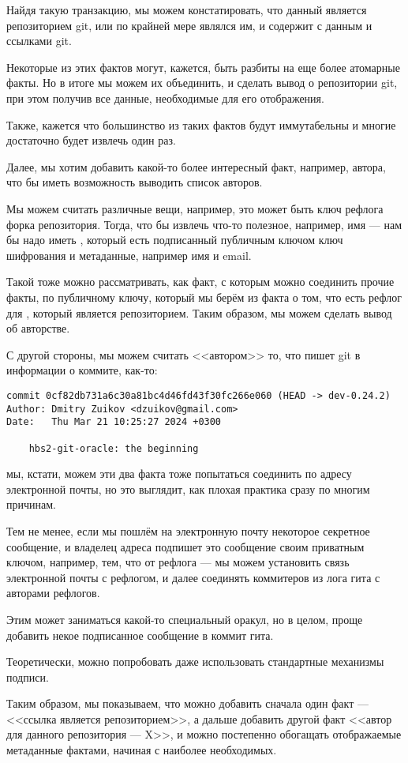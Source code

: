 Найдя такую транзакцию, мы можем констатировать, что данный
 является репозиторием git, или по крайней мере являлся им,
и содержит  с данным  и
ссылками git.

Некоторые из этих фактов могут, кажется, быть разбиты на еще более атомарные
факты. Но в итоге мы можем их объединить, и сделать вывод  о репозитории git,
при этом получив все данные, необходимые для его отображения.

Также, кажется что большинство из таких фактов будут иммутабельны и многие
достаточно будет извлечь один раз.

Далее, мы хотим добавить какой-то более интересный факт, например, автора, что
бы иметь возможность выводить список авторов.

Мы можем считать  различные вещи, например, это может быть
ключ рефлога форка репозитория. Тогда, что бы извлечь что-то полезное, например,
имя --- нам бы надо иметь , который есть подписанный
публичным ключом ключ шифрования и метаданные, например имя и email.

Такой  тоже можно рассматривать, как факт, с которым
можно соединить прочие факты, по публичному ключу, который мы берём из факта о
том, что есть рефлог для , который является репозиторием.
Таким образом, мы можем сделать вывод об авторстве.

С другой стороны, мы можем считать <<автором>> то, что пишет git в информации о
коммите, как-то:

\begin{verbatim}
commit 0cf82db731a6c30a81bc4d46fd43f30fc266e060 (HEAD -> dev-0.24.2)
Author: Dmitry Zuikov <dzuikov@gmail.com>
Date:   Thu Mar 21 10:25:27 2024 +0300

    hbs2-git-oracle: the beginning
\end{verbatim}

мы, кстати, можем эти два факта тоже попытаться соединить по адресу электронной
почты, но это выглядит, как плохая практика сразу по многим причинам.

Тем не менее, если мы пошлём на электронную почту некоторое секретное сообщение,
и владелец адреса подпишет это сообщение своим приватным ключом, например, тем,
что от рефлога --- мы можем установить связь электронной почты с рефлогом, и
далее соединять коммитеров из лога гита с авторами рефлогов.

Этим может заниматься какой-то специальный оракул, но в целом, проще добавить
некое подписанное сообщение в коммит гита.

Теоретически, можно попробовать даже использовать стандартные механизмы подписи.

Таким образом, мы показываем, что можно добавить сначала один факт --- <<ссылка
является репозиторием>>, а дальше добавить другой факт <<автор для данного
репозитория --- X>>, и можно постепенно обогащать отображаемые метаданные
фактами, начиная с наиболее необходимых.


